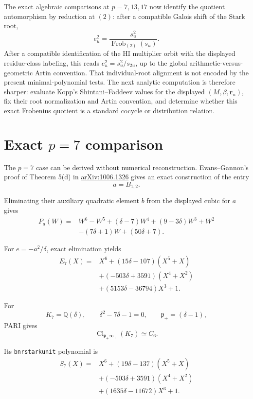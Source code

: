 \documentclass[11pt,reqno]{amsart}
\theoremstyle{plain}
\begin{document}
The exact algebraic comparisons at \(p=7,13,17\) now identify the quotient automorphism by reduction at \((2)\): after a compatible Galois shift of the Stark root,
\[
\boxed{
e_u^2=\frac{s_u^2}{\operatorname{Frob}_{(2)}(s_u)}.
}
\]
After a compatible identification of the HI multiplier orbit with the displayed residue-class labeling, this reads \(e_u^2=s_u^2/s_{2u}\), up to the global arithmetic-versus-geometric Artin convention. That individual-root alignment is not encoded by the present minimal-polynomial tests. The next analytic computation is therefore sharper: evaluate Kopp's Shintani--Faddeev values for the displayed \((M,\beta,\mathbf r_u)\), fix their root normalization and Artin convention, and determine whether this exact Frobenius quotient is a standard cocycle or distribution relation.

\section{\texorpdfstring{Exact \(p=7\) comparison}{Exact p=7 comparison}}\label{sec:24}

The \(p=7\) case can be derived without numerical reconstruction. Evans--Gannon's proof of Theorem 5(d) in \href{https://arxiv.org/abs/1006.1326}{arXiv:1006.1326} gives an exact construction of the entry
\[
a=B_{1,2}.
\]

Eliminating their auxiliary quadratic element \(b\) from the displayed cubic for \(a\) gives
\[
\begin{aligned}
P_a(W)={}&W^6-W^5+(\delta-7)W^4+(9-3\delta)W^3+W^2\\
&-(7\delta+1)W+(50\delta+7).
\end{aligned}
\]

For \(e=-a^2/\delta\), exact elimination yields
\[
\boxed{
\begin{aligned}
E_7(X)={}&X^6+(15\delta-107)(X^5+X)\\
&+(-503\delta+3591)(X^4+X^2)\\
&+(5153\delta-36794)X^3+1.
\end{aligned}
}
\]

For
\[
K_7=\mathbb Q(\delta),
\qquad
\delta^2-7\delta-1=0,
\qquad
\mathfrak p_+=(\delta-1),
\]
PARI gives
\[
\operatorname{Cl}_{\mathfrak p_+\infty_+}(K_7)\simeq C_6.
\]

Its \texttt{bnrstarkunit} polynomial is
\[
\begin{aligned}
S_7(X)={}&X^6+(19\delta-137)(X^5+X)\\
&+(-503\delta+3591)(X^4+X^2)\\
&+(1635\delta-11672)X^3+1.
\end{aligned}
\]
\end{document}
